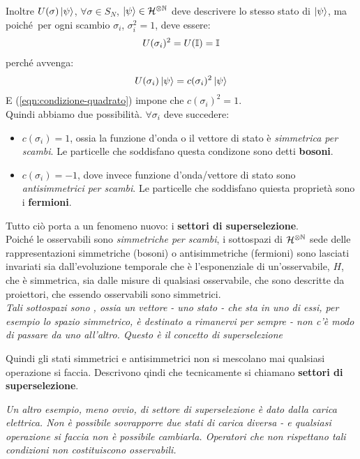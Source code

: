 \documentclass[../../FisicaTeorica.tex]{subfiles}
\begin{document}
Inoltre $U(\sigma)\ket{\psi}$, $\forall \sigma \in S_N$, $\ket{\psi} \in \mathcal{H}^{\otimes \mathbb{N}}$ deve descrivere lo stesso stato di $\ket{\psi}$, ma poiché\ per ogni scambio $\sigma_i$, $\sigma_i^2 = 1$, deve essere:
\begin{align}
U(\sigma_i)^2 = U(\mathbb{I}) = \mathbb{I}
\label{eqn:condizione-quadrato}
\end{align}
perché avvenga:
\begin{align*}
U(\sigma_i) \ket{\psi} = c(\sigma_i)^2 \ket{\psi}
\end{align*}
E (\ref{eqn:condizione-quadrato}) impone che $c(\sigma_i)^2=1$.\\

Quindi abbiamo due possibilità. $\forall \sigma_i$ deve succedere:
\begin{itemize}
\item $c(\sigma_i) = 1$, ossia la funzione d'onda o il vettore di stato è \textit{simmetrica per scambi}. Le particelle che soddisfano questa condizone sono detti \textbf{bosoni}.
\item $c(\sigma_i)=-1$, dove invece funzione d'onda/vettore di stato sono \textit{antisimmetrici per scambi}. Le particelle che soddisfano quiesta proprietà sono i \textbf{fermioni}.
\end{itemize}

Tutto ciò porta a un fenomeno nuovo: i \textbf{settori di superselezione}.\\
Poiché le osservabili sono \textit{simmetriche per scambi}, i sottospazi di $\mathcal{H}^{\otimes \mathbb{N}}$ sede delle rappresentazioni simmetriche (bosoni) o antisimmetriche (fermioni) sono lasciati invariati sia dall'evoluzione temporale che è l'esponenziale di un'osservabile, $H$, che è simmetrica, sia dalle misure di qualsiasi osservabile, che sono descritte da proiettori, che essendo osservabili sono simmetrici.\\
\textit{Tali sottospazi sono , ossia un vettore - uno stato - che sta in uno di essi, per esempio lo spazio simmetrico, è destinato a rimanervi per sempre - non c'è modo di passare da uno all'altro. Questo è il concetto di superselezione}

Quindi gli stati simmetrici e antisimmetrici non si mescolano mai qualsiasi operazione si faccia. Descrivono qindi  che tecnicamente si chiamano \textbf{settori di superselezione}.

\textit{Un altro esempio, meno ovvio, di settore di superselezione è dato dalla carica elettrica. Non è possibile sovrapporre due stati di carica diversa - e qualsiasi operazione si faccia non è possibile cambiarla. Operatori che non rispettano tali condizioni non costituiscono osservabili.}
\end{document}
